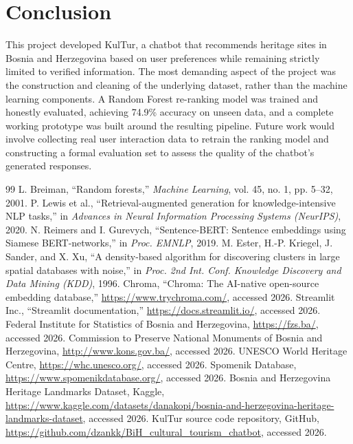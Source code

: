 \documentclass[conference]{IEEEtran}
\begin{document}
\section{Conclusion}
This project developed KulTur, a chatbot that recommends heritage sites in Bosnia and Herzegovina based on user preferences while remaining strictly limited to verified information. The most demanding aspect of the project was the construction and cleaning of the underlying dataset, rather than the machine learning components. A Random Forest re-ranking model was trained and honestly evaluated, achieving 74.9\% accuracy on unseen data, and a complete working prototype was built around the resulting pipeline. Future work would involve collecting real user interaction data to retrain the ranking model and constructing a formal evaluation set to assess the quality of the chatbot's generated responses.

\begin{thebibliography}{99}
 L. Breiman, ``Random forests,'' \textit{Machine Learning}, vol. 45, no. 1, pp. 5--32, 2001.
 P. Lewis et al., ``Retrieval-augmented generation for knowledge-intensive NLP tasks,'' in \textit{Advances in Neural Information Processing Systems (NeurIPS)}, 2020.
 N. Reimers and I. Gurevych, ``Sentence-BERT: Sentence embeddings using Siamese BERT-networks,'' in \textit{Proc. EMNLP}, 2019.
 M. Ester, H.-P. Kriegel, J. Sander, and X. Xu, ``A density-based algorithm for discovering clusters in large spatial databases with noise,'' in \textit{Proc. 2nd Int. Conf. Knowledge Discovery and Data Mining (KDD)}, 1996.
 Chroma, ``Chroma: The AI-native open-source embedding database,'' \url{https://www.trychroma.com/}, accessed 2026.
 Streamlit Inc., ``Streamlit documentation,'' \url{https://docs.streamlit.io/}, accessed 2026.
 Federal Institute for Statistics of Bosnia and Herzegovina, \url{https://fzs.ba/}, accessed 2026.
 Commission to Preserve National Monuments of Bosnia and Herzegovina, \url{http://www.kons.gov.ba/}, accessed 2026.
 UNESCO World Heritage Centre, \url{https://whc.unesco.org/}, accessed 2026.
 Spomenik Database, \url{https://www.spomenikdatabase.org/}, accessed 2026.
 Bosnia and Herzegovina Heritage Landmarks Dataset, Kaggle, \url{https://www.kaggle.com/datasets/danakopi/bosnia-and-herzegovina-heritage-landmarks-dataset}, accessed 2026.
 KulTur source code repository, GitHub, \url{https://github.com/dzankk/BiH_cultural_tourism_chatbot}, accessed 2026.
\end{thebibliography}
\end{document}
